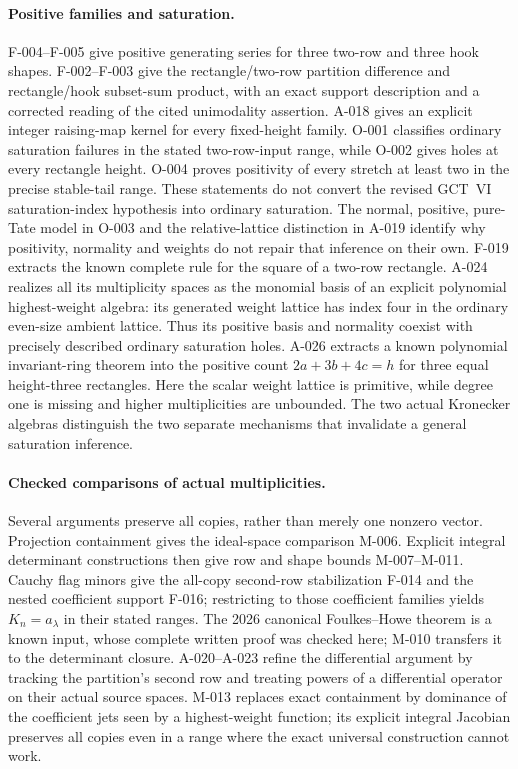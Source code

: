 \paragraph{Positive families and saturation.}
F-004--F-005 give positive generating series for three two-row
and three hook shapes. F-002--F-003 give the rectangle/two-row
partition difference and rectangle/hook subset-sum product, with an
exact support description and a corrected reading of the cited
unimodality assertion. A-018 gives an explicit integer raising-map
kernel for every fixed-height family. O-001 classifies ordinary
saturation failures in the stated two-row-input range, while O-002
gives holes at every rectangle height. O-004 proves positivity of
every stretch at least two in the precise stable-tail range.
These statements do not convert the revised GCT~VI saturation-index
hypothesis into ordinary saturation. The normal, positive, pure-Tate
model in O-003 and the relative-lattice distinction in A-019
identify why positivity, normality and weights do not repair that
inference on their own. F-019 extracts the known complete rule for
the square of a two-row rectangle. A-024 realizes all its multiplicity
spaces as the monomial basis of an explicit polynomial highest-weight
algebra: its generated weight lattice has index four in the ordinary
even-size ambient lattice. Thus its positive basis and normality
coexist with precisely described ordinary saturation holes.
A-026 extracts a known polynomial invariant-ring theorem into the
positive count \(2a+3b+4c=h\) for three equal height-three
rectangles. Here the scalar weight lattice is primitive, while
degree one is missing and higher multiplicities are unbounded.
The two actual Kronecker algebras distinguish the two separate
mechanisms that invalidate a general saturation inference.

\paragraph{Checked comparisons of actual multiplicities.}
Several arguments preserve all copies, rather than merely one
nonzero vector. Projection containment gives the ideal-space
comparison M-006. Explicit integral determinant constructions
then give row and shape bounds M-007--M-011. Cauchy flag minors
give the all-copy second-row stabilization F-014 and the nested
coefficient support F-016; restricting to those coefficient
families yields \(K_n=a_\lambda\) in their stated ranges.
The 2026 canonical Foulkes--Howe theorem is a known input, whose
complete written proof was checked here; M-010 transfers it to
the determinant closure. A-020--A-023 refine the differential
argument by tracking the partition's second row and treating powers
of a differential operator on their actual source spaces.
M-013 replaces exact containment by dominance of the coefficient
jets seen by a highest-weight function; its explicit integral
Jacobian preserves all copies even in a range where the exact
universal construction cannot work.

